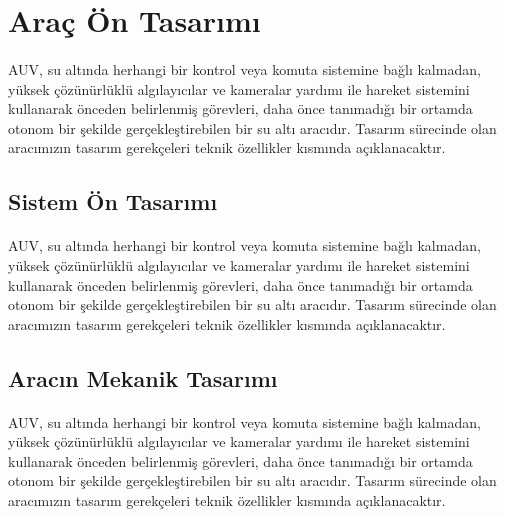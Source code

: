 \documentclass[12pt]{article}
\begin{document}
\section{Araç Ön Tasarımı}

\begin{justify}
\paragraph{} AUV, su altında herhangi bir kontrol veya komuta sistemine bağlı kalmadan, yüksek çözünürlüklü algılayıcılar ve kameralar yardımı ile hareket sistemini kullanarak önceden belirlenmiş görevleri, daha önce tanımadığı bir ortamda otonom bir şekilde gerçekleştirebilen bir su altı aracıdır. Tasarım sürecinde olan aracımızın tasarım gerekçeleri teknik özellikler kısmında açıklanacaktır.
\end{justify}

\subsection{Sistem Ön Tasarımı}

\begin{justify}
\paragraph{} AUV, su altında herhangi bir kontrol veya komuta sistemine bağlı kalmadan, yüksek çözünürlüklü algılayıcılar ve kameralar yardımı ile hareket sistemini kullanarak önceden belirlenmiş görevleri, daha önce tanımadığı bir ortamda otonom bir şekilde gerçekleştirebilen bir su altı aracıdır. Tasarım sürecinde olan aracımızın tasarım gerekçeleri teknik özellikler kısmında açıklanacaktır.
\end{justify}

\subsection{Aracın Mekanik Tasarımı}

\begin{justify}
\paragraph{} AUV, su altında herhangi bir kontrol veya komuta sistemine bağlı kalmadan, yüksek çözünürlüklü algılayıcılar ve kameralar yardımı ile hareket sistemini kullanarak önceden belirlenmiş görevleri, daha önce tanımadığı bir ortamda otonom bir şekilde gerçekleştirebilen bir su altı aracıdır. Tasarım sürecinde olan aracımızın tasarım gerekçeleri teknik özellikler kısmında açıklanacaktır.
\end{justify}
\end{document}
